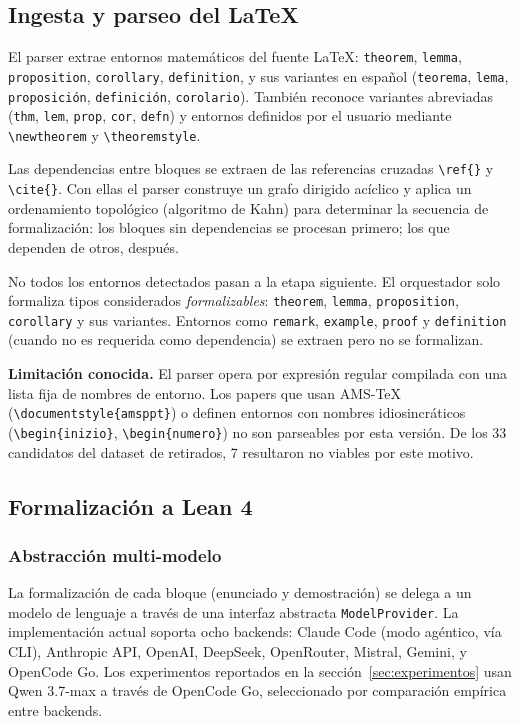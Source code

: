 \documentclass[12pt,a4paper]{article}
\theoremstyle{remark}
\begin{document}
\subsection{Ingesta y parseo del LaTeX}

El parser extrae entornos matemáticos del fuente LaTeX: \texttt{theorem}, \texttt{lemma}, \texttt{proposition}, \texttt{corollary}, \texttt{definition}, y sus variantes en español (\texttt{teorema}, \texttt{lema}, \texttt{proposición}, \texttt{definición}, \texttt{corolario}). También reconoce variantes abreviadas (\texttt{thm}, \texttt{lem}, \texttt{prop}, \texttt{cor}, \texttt{defn}) y entornos definidos por el usuario mediante \verb|\newtheorem| y \verb|\theoremstyle|.

Las dependencias entre bloques se extraen de las referencias cruzadas \verb|\ref{}| y \verb|\cite{}|. Con ellas el parser construye un grafo dirigido acíclico y aplica un ordenamiento topológico (algoritmo de Kahn) para determinar la secuencia de formalización: los bloques sin dependencias se procesan primero; los que dependen de otros, después.

No todos los entornos detectados pasan a la etapa siguiente. El orquestador solo formaliza tipos considerados \textit{formalizables}: \texttt{theorem}, \texttt{lemma}, \texttt{proposition}, \texttt{corollary} y sus variantes. Entornos como \texttt{remark}, \texttt{example}, \texttt{proof} y \texttt{definition} (cuando no es requerida como dependencia) se extraen pero no se formalizan.

\textbf{Limitación conocida.} El parser opera por expresión regular compilada con una lista fija de nombres de entorno. Los papers que usan AMS-\TeX{} (\verb|\documentstyle{amsppt}|) o definen entornos con nombres idiosincráticos (\verb|\begin{inizio}|, \verb|\begin{numero}|) no son parseables por esta versión. De los 33 candidatos del dataset de retirados, 7 resultaron no viables por este motivo.

\subsection{Formalización a Lean 4}

\subsubsection{Abstracción multi-modelo}

La formalización de cada bloque (enunciado y demostración) se delega a un modelo de lenguaje a través de una interfaz abstracta \texttt{ModelProvider}. La implementación actual soporta ocho backends: Claude Code (modo agéntico, vía CLI), Anthropic API, OpenAI, DeepSeek, OpenRouter, Mistral, Gemini, y OpenCode Go. Los experimentos reportados en la sección~\ref{sec:experimentos} usan Qwen 3.7-max a través de OpenCode Go, seleccionado por comparación empírica entre backends.
\end{document}
